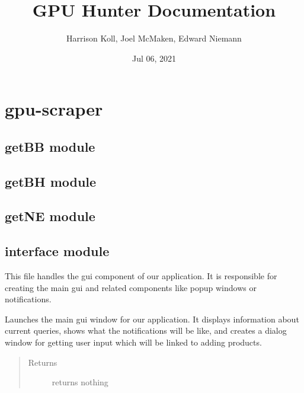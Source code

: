 \documentclass[letterpaper,10pt,english]{sphinxmanual}
\title{GPU Hunter Documentation}
\date{Jul 06, 2021}
\author{Harrison Koll, Joel McMaken, Edward Niemann}
\begin{document}
\pagestyle{empty}
\sphinxmaketitle
\pagestyle{plain}
\sphinxtableofcontents
\pagestyle{normal}
\label{\detokenize{index::doc}}



\chapter{gpu-scraper}
\label{\detokenize{modules:gpu-scraper}}\label{\detokenize{modules::doc}}

\section{getBB module}
\label{\detokenize{getBB:getbb-module}}\label{\detokenize{getBB::doc}}

\section{getBH module}
\label{\detokenize{getBH:getbh-module}}\label{\detokenize{getBH::doc}}

\section{getNE module}
\label{\detokenize{getNE:getne-module}}\label{\detokenize{getNE::doc}}

\section{interface module}
\label{\detokenize{interface:module-interface}}\label{\detokenize{interface:interface-module}}\label{\detokenize{interface::doc}}
This file handles the gui component of our application. It is responsible for 
creating the main gui and related components like popup windows or notifications.

\begin{fulllineitems}
\label{\detokenize{interface:interface.launchGUI}}
Launches the main gui window for our application. It displays information
about current queries, shows what the notifications will be like, and
creates a dialog window for getting user input which will be linked to adding
products.
\begin{quote}\begin{description}
\item[{Returns}] \leavevmode
returns nothing

\end{description}\end{quote}

\end{fulllineitems}
\end{document}
